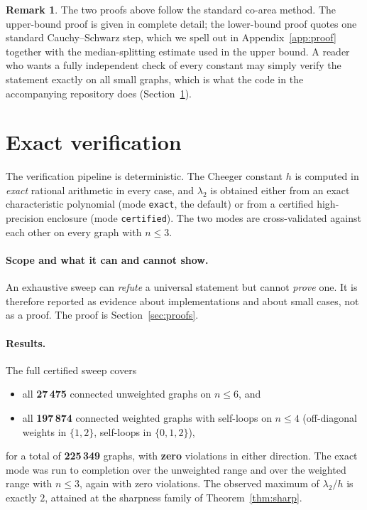 \documentclass[11pt,a4paper]{article}
\theoremstyle{plain}
\theoremstyle{definition}
\newtheorem{remark}[theorem]{Remark}
\begin{document}
\begin{remark}\label{rem:proofcaveat}
The two proofs above follow the standard co-area method.  The upper-bound
proof is given in complete detail; the lower-bound proof quotes one standard
Cauchy--Schwarz step, which we spell out in Appendix~\ref{app:proof} together
with the median-splitting estimate used in the upper bound.  A reader who wants
a fully independent check of every constant may simply verify the statement
exactly on all small graphs, which is what the code in the accompanying
repository does (Section~\ref{sec:experiments}).
\end{remark}

\section{Exact verification}\label{sec:experiments}

The verification pipeline is deterministic.  The Cheeger constant $h$ is computed
in \emph{exact} rational arithmetic in every case, and $\lambda_2$ is obtained
either from an exact characteristic polynomial (mode \texttt{exact}, the
default) or from a certified high-precision enclosure (mode \texttt{certified}).
The two modes are cross-validated against each other on every graph with
$n\le 3$.

\paragraph{Scope and what it can and cannot show.}
An exhaustive sweep can \emph{refute} a universal statement but cannot
\emph{prove} one.  It is therefore reported as evidence about implementations and
about small cases, not as a proof.  The proof is Section~\ref{sec:proofs}.

\paragraph{Results.}
The full certified sweep covers
\begin{itemize}[leftmargin=*,itemsep=1pt]
\item all \textbf{27\,475} connected unweighted graphs on $n\le 6$, and
\item all \textbf{197\,874} connected weighted graphs with self-loops on
      $n\le 4$ (off-diagonal weights in $\{1,2\}$, self-loops in $\{0,1,2\}$),
\end{itemize}
for a total of \textbf{225\,349} graphs, with \textbf{zero} violations in either
direction.  The exact mode was run to completion over the unweighted range and
over the weighted range with $n\le 3$, again with zero violations.  The
observed maximum of $\lambda_2/h$ is exactly $2$, attained at the sharpness
family of Theorem~\ref{thm:sharp}.
\end{document}
